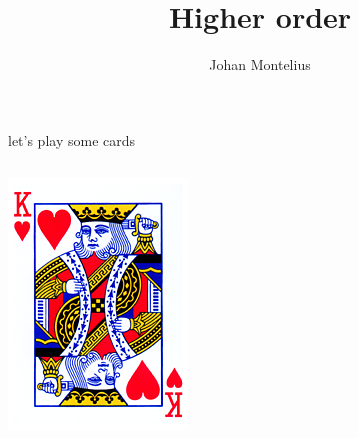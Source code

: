 

\title[ID1019 Higher order]{Higher order}


\author{Johan Montelius}
\date{\semester}



\begin{frame}
\titlepage
\end{frame}

\begin{frame}[fragile]{let's play some cards}

\begin{columns}

 \begin{column}{0.2\linewidth}
   \includegraphics[width=\linewidth]{kung.png}
 \end{column}
 
 \pause


\end{columns}
\end{frame}
